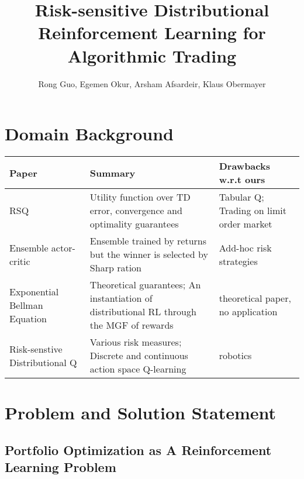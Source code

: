 

\title{Risk-sensitive Distributional Reinforcement Learning for Algorithmic Trading}
\author{Rong Guo, Egemen Okur, Arsham Afsardeir, Klaus Obermayer}



\maketitle

\listoftodos

\section{Domain Background}

\begin{center}
\begin{longtable}{| m{4cm} | m{5cm} | m{5cm} | }
\hline
\textbf{Paper} & \textbf{Summary} & \textbf{Drawbacks w.r.t ours}\\
\hline
\hline
RSQ \citep{shen_risk-sensitive_2014, shen_risk-averse_2014} & Utility function over TD error, convergence and optimality guarantees & Tabular Q; Trading on limit order market \\
\hline
Ensemble actor-critic \citep{yang_deep_2020} & Ensemble trained by returns but the winner is selected by Sharp ration & Add-hoc risk strategies\\
\hline
Exponential Bellman Equation \citep{fei_exponential_nodate} & Theoretical guarantees; An instantiation of distributional RL through the MGF of rewards & theoretical paper, no application \\
\hline
Risk-senstive Distributional Q \citep{bodnar_quantile_2020, dabney_implicit_2018} & Various risk measures; Discrete and continuous action space Q-learning & robotics\\
\hline
\end{longtable}
\end{center}


\section{Problem and Solution Statement}

\subsection{Portfolio Optimization as A Reinforcement Learning Problem}

